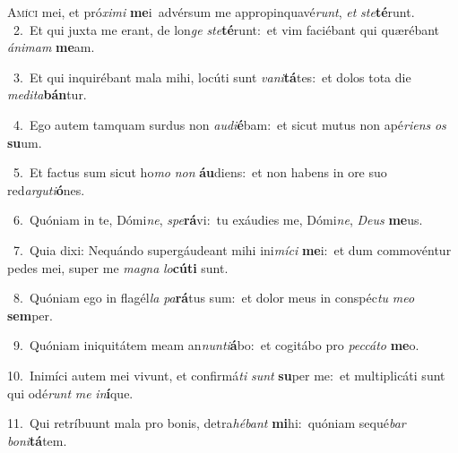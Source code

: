 \lettrine{\initial\textcolor{\initialcolor}{A}}{míci} mei, et pró\-\textit{xi}\-\textit{mi} \textbf{me}\-i~\star advérsum me appropinquavé\-\textit{runt}\-, \textit{et} \textit{ste}\-\textbf{té}runt.\\
{\numbfont\textcolor{\numbcolor}{~2.}}~Et qui juxta me erant, de lon\textit{ge} \textit{ste}\-\textbf{té}runt:~\star et vim faciébant qui quærébant \textit{á}\-\textit{ni}\textit{mam} \textbf{me}\-am.\par
{\numbfont\textcolor{\numbcolor}{~3.}}~Et qui inquirébant mala mihi, locúti sunt \textit{va}\-\textit{ni}\textbf{tá}tes:~\star et dolos tota die \textit{me}\-\textit{di}\textit{ta}\textbf{bán}tur.\par
{\numbfont\textcolor{\numbcolor}{~4.}}~Ego autem tamquam surdus non \textit{au}\-\textit{di}\textbf{é}bam:~\star et sicut mutus non apé\-\textit{ri}\-\textit{ens} \textit{os} \textbf{su}\-um.\par
{\numbfont\textcolor{\numbcolor}{~5.}}~Et factus sum sicut ho\textit{mo} \textit{non} \textbf{áu}\-diens:~\star et non habens in ore suo red\-\textit{ar}\-\textit{gu}\textit{ti}\textbf{ó}nes.\par
{\numbfont\textcolor{\numbcolor}{~6.}}~Quóniam in te, Dómi\-\textit{ne}\-, \textit{spe}\-\textbf{rá}vi:~\star tu exáudies me, Dómi\-\textit{ne}\-, \textit{De}\-\textit{us} \textbf{me}\-us.\par
{\numbfont\textcolor{\numbcolor}{~7.}}~Quia dixi: Nequándo supergáudeant mihi ini\-\textit{mí}\-\textit{ci} \textbf{me}\-i:~\star et dum commovéntur pedes mei, super me \textit{ma}\-\textit{gna} \textit{lo}\-\textbf{cú}\textbf{ti} sunt.\par
{\numbfont\textcolor{\numbcolor}{~8.}}~Quóniam ego in flagél\textit{la} \textit{pa}\-\textbf{rá}tus sum:~\star et dolor meus in conspéc\textit{tu} \textit{me}\-\textit{o} \textbf{sem}\-per.\par
{\numbfont\textcolor{\numbcolor}{~9.}}~Quóniam iniquitátem meam an\-\textit{nun}\-\textit{ti}\textbf{á}bo:~\star et cogitábo pro \textit{pec}\-\textit{cá}\textit{to} \textbf{me}\-o.\par
{\numbfont\textcolor{\numbcolor}{10.}}~Inimíci autem mei vivunt, et confirmá\textit{ti} \textit{sunt} \textbf{su}\-per me:~\star et multiplicáti sunt qui odé\textit{runt} \textit{me} \textit{in}\-\textbf{í}que.\par
{\numbfont\textcolor{\numbcolor}{11.}}~Qui retríbuunt mala pro bonis, detra\-\textit{hé}\-\textit{bant} \textbf{mi}\-hi:~\star quóniam sequé\textit{bar} \textit{bo}\-\textit{ni}\textbf{tá}tem.\par
